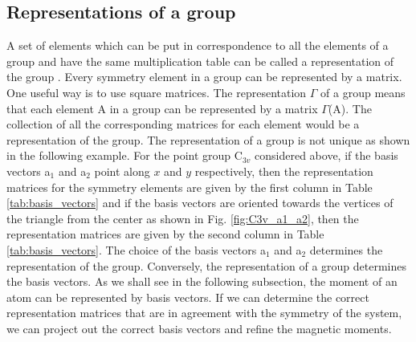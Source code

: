 \documentclass[10pt,doublespacing,edeposit]{uiucthesis2020}
\begin{document}
\begin{mainmatter}
\subsection{Representations of a group}

A set of elements which can be put in correspondence to all the elements of a group and have the same multiplication table can be called a representation of the group \cite{Koster1956}. Every symmetry element in a group can be represented by a matrix. One useful way is to use square matrices. The representation $\Gamma$ of a group means that each element A in a group can be represented by a matrix $\Gamma$(A). The collection of all the corresponding matrices for each element would be a representation of the group. The representation of a group is not unique as shown in the following example. For the point group C$_{3v}$ considered above, if the basis vectors a$_1$ and a$_2$ point along $x$ and $y$ respectively, then the representation matrices for the symmetry elements are given by the first column in Table \ref{tab:basis_vectors} and if the basis vectors are oriented towards the vertices of the triangle from the center as shown in Fig. \ref{fig:C3v_a1_a2}, then the representation matrices are given by the second column in Table \ref{tab:basis_vectors}. The choice of the basis vectors a$_1$ and a$_2$ determines the representation of the group. Conversely, the representation of a group determines the basis vectors. As we shall see in the following subsection, the moment of an atom can be represented by basis vectors. If we can determine the correct representation matrices that are in agreement with the symmetry of the system, we can project out the correct basis vectors and refine the magnetic moments.


\end{mainmatter}
\end{document}

